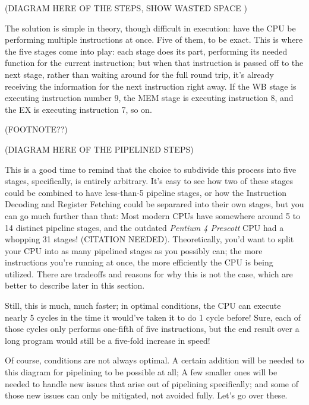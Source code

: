 \documentclass[12pt,twoside]{reedthesis}
\begin{document}
(DIAGRAM HERE OF THE STEPS, SHOW WASTED SPACE )

The solution is simple in theory, though difficult in execution: have the CPU be performing multiple instructions at once. Five of them, to be exact. This is where the five stages come into play: each stage does its part, performing its needed function for the current instruction; but when that instruction is passed off to the next stage, rather than waiting around for the full round trip, it's already receiving the information for the next instruction right away. If the WB stage is executing instruction number 9, the MEM stage is executing instruction 8, and the EX is executing instruction 7, so on.

(FOOTNOTE??)

(DIAGRAM HERE OF THE PIPELINED STEPS)

This is a good time to remind that the choice to subdivide this process into five stages, specifically, is entirely arbitrary. It's easy to see how two of these stages could be combined to have less-than-5 pipeline stages, or how the Instruction Decoding and Register Fetching could be separared into their own stages, but you can go much further than that: Most modern CPUs have somewhere around 5 to 14 distinct pipeline stages, and the outdated \textit{Pentium 4 Prescott} CPU had a whopping 31 stages! (CITATION NEEDED). Theoretically, you'd want to split your CPU into as many pipelined stages as you possibly can; the more instructions you're running at once, the more efficiently the CPU is being utilized. There are tradeoffs and reasons for why this is not the case, which are better to describe later in this section.

Still, this is much, much faster;  in optimal conditions, the CPU can execute nearly 5 cycles in the time it would've taken it to do 1 cycle before! Sure, each of those cycles only performs one-fifth of five instructions, but the end result over a long program would still be a five-fold increase in speed!

Of course, conditions are not always optimal. A certain addition will be needed to this diagram for pipelining to be possible at all; A few smaller ones will be needed to handle new issues that arise out of pipelining specifically; and some of those new issues can only be mitigated, not avoided fully. Let's go over these.
\end{document}
